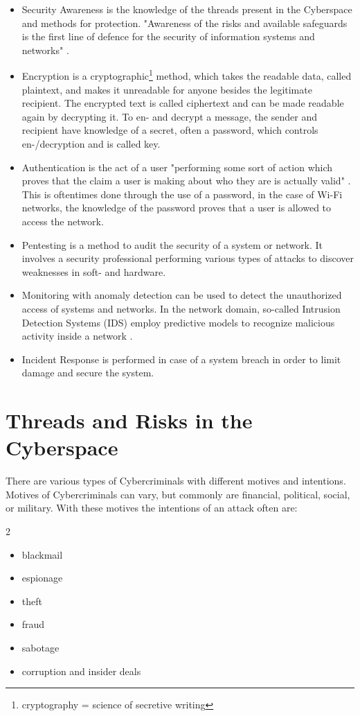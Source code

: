 \begin{itemize}
    \item Security Awareness is the knowledge of the threads present in the Cyberspace and methods for protection.
    "Awareness of the risks and available safeguards is the first line of defence for the security of information systems and networks" \cite[page~26]{IT_Basiswissen}.
    \item Encryption is a cryptographic\footnote{cryptography = science of secretive writing} method, which takes the readable data, called plaintext, and makes it unreadable for anyone besides the legitimate recipient.
    The encrypted text is called ciphertext and can be made readable again by decrypting it.
    To en- and decrypt a message, the sender and recipient have knowledge of a secret, often a password, which controls en-/decryption and is called key. \cite[page~1]{Watjen_2018}
    \item Authentication is the act of a user "performing some sort of action which proves that the claim a user is making about who they are is actually valid" \cite{Oriyano_2017}. 
    This is oftentimes done through the use of a password, in the case of Wi-Fi networks, the knowledge of the password proves that a user is allowed to access the network.
    \item Pentesting is a method to audit the security of a system or network. 
    It involves a security professional performing various types of attacks to discover weaknesses in soft- and hardware.
    \item Monitoring with anomaly detection can be used to detect the unauthorized access of systems and networks.
    In the network domain, so-called Intrusion Detection Systems (IDS) employ predictive models to recognize malicious activity inside a network \cite{geeksforgeeks_ids}.
    \item Incident Response is performed in case of a system breach in order to limit damage and secure the system.
\end{itemize}

\section{Threads and Risks in the Cyberspace}
There are various types of Cybercriminals with different motives and intentions.
Motives of Cybercriminals can vary, but commonly are financial, political, social, or military.
With these motives the intentions of an attack often are:
\begin{multicols}{2}
    \begin{itemize}
        \item blackmail
        \item espionage
        \item theft
        \item fraud
        \item sabotage
        \item corruption and insider deals
    \end{itemize}
\end{multicols}

